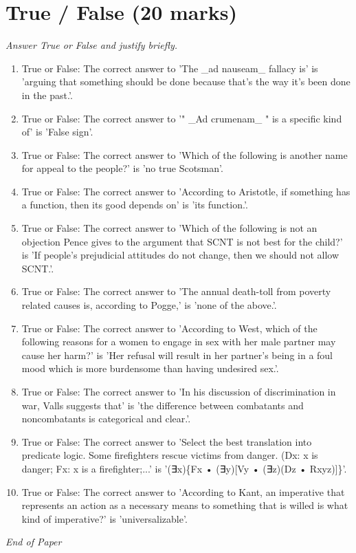 \documentclass[12pt]{article}
\begin{document}
\section*{True / False (20 marks)}
\textit{Answer True or False and justify briefly.}
\begin{enumerate}[label=\arabic*.]
\item True or False: The correct answer to 'The \_ad nauseam\_ fallacy is' is 'arguing that something should be done because that's the way it's been done in the past.'.
\item True or False: The correct answer to '" \_Ad crumenam\_ " is a specific kind of' is 'False sign'.
\item True or False: The correct answer to 'Which of the following is another name for appeal to the people?' is 'no true Scotsman'.
\item True or False: The correct answer to 'According to Aristotle, if something has a function, then its good depends on' is 'its function.'.
\item True or False: The correct answer to 'Which of the following is not an objection Pence gives to the argument that SCNT is not best for the child?' is 'If people's prejudicial attitudes do not change, then we should not allow SCNT.'.
\item True or False: The correct answer to 'The annual death-toll from poverty related causes is, according to Pogge,' is 'none of the above.'.
\item True or False: The correct answer to 'According to West, which of the following reasons for a women to engage in sex with her male partner may cause her harm?' is 'Her refusal will result in her partner's being in a foul mood which is more burdensome than having undesired sex.'.
\item True or False: The correct answer to 'In his discussion of discrimination in war, Valls suggests that' is 'the difference between combatants and noncombatants is categorical and clear.'.
\item True or False: The correct answer to 'Select the best translation into predicate logic. Some firefighters rescue victims from danger. (Dx: x is danger; Fx: x is a firefighter;...' is '(∃x)\{Fx • (∃y)[Vy • (∃z)(Dz • Rxyz)]\}'.
\item True or False: The correct answer to 'According to Kant, an imperative that represents an action as a necessary means to something that is willed is what kind of imperative?' is 'universalizable'.
\end{enumerate}

\vfill
\noindent\textit{End of Paper}
\end{document}

